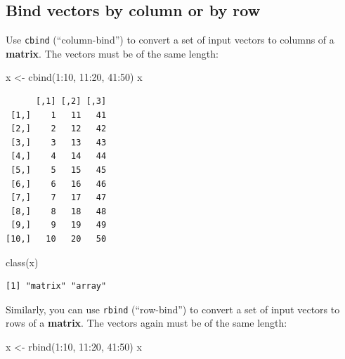 \documentclass[
]{book}
\newenvironment{Shaded}{\begin{snugshade}}{\end{snugshade}}
\newcommand{\DecValTok}[1]{\textcolor[rgb]{0.00,0.00,0.81}{#1}}
\newcommand{\FunctionTok}[1]{\textcolor[rgb]{0.00,0.00,0.00}{#1}}
\newcommand{\NormalTok}[1]{#1}
\newcommand{\OtherTok}[1]{\textcolor[rgb]{0.56,0.35,0.01}{#1}}
\newcommand{\SpecialCharTok}[1]{\textcolor[rgb]{0.00,0.00,0.00}{#1}}
\begin{document}
\hypertarget{bind-vectors-by-column-or-by-row}{%
\subsection{Bind vectors by column or by row}\label{bind-vectors-by-column-or-by-row}}

Use \texttt{cbind} (``column-bind'') to convert a set of input vectors to columns of a \textbf{matrix}. The vectors must be of the same length:

\begin{Shaded}
\begin{Highlighting}[]
\NormalTok{x }\OtherTok{\textless{}{-}} \FunctionTok{cbind}\NormalTok{(}\DecValTok{1}\SpecialCharTok{:}\DecValTok{10}\NormalTok{, }\DecValTok{11}\SpecialCharTok{:}\DecValTok{20}\NormalTok{, }\DecValTok{41}\SpecialCharTok{:}\DecValTok{50}\NormalTok{)}
\NormalTok{x}
\end{Highlighting}
\end{Shaded}

\begin{verbatim}
      [,1] [,2] [,3]
 [1,]    1   11   41
 [2,]    2   12   42
 [3,]    3   13   43
 [4,]    4   14   44
 [5,]    5   15   45
 [6,]    6   16   46
 [7,]    7   17   47
 [8,]    8   18   48
 [9,]    9   19   49
[10,]   10   20   50
\end{verbatim}

\begin{Shaded}
\begin{Highlighting}[]
\FunctionTok{class}\NormalTok{(x)}
\end{Highlighting}
\end{Shaded}

\begin{verbatim}
[1] "matrix" "array" 
\end{verbatim}

Similarly, you can use \texttt{rbind} (``row-bind'') to convert a set of input vectors to rows of a \textbf{matrix}. The vectors again must be of the same length:

\begin{Shaded}
\begin{Highlighting}[]
\NormalTok{x }\OtherTok{\textless{}{-}} \FunctionTok{rbind}\NormalTok{(}\DecValTok{1}\SpecialCharTok{:}\DecValTok{10}\NormalTok{, }\DecValTok{11}\SpecialCharTok{:}\DecValTok{20}\NormalTok{, }\DecValTok{41}\SpecialCharTok{:}\DecValTok{50}\NormalTok{)}
\NormalTok{x}
\end{Highlighting}
\end{Shaded}
\end{document}
